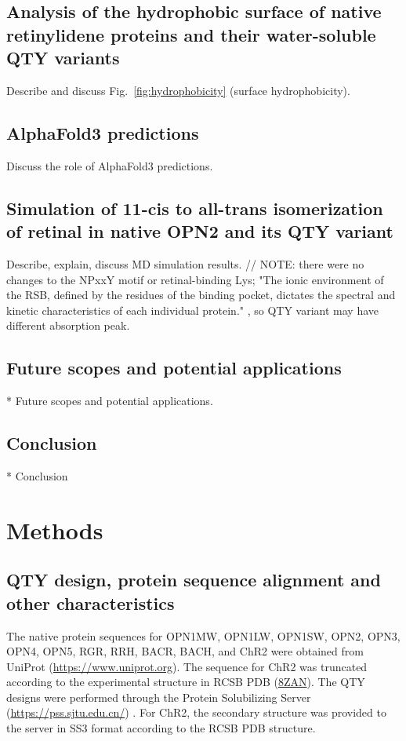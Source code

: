\documentclass[fleqn,10pt,lineno]{manuscript}
\begin{document}
\subsection*{Analysis of the hydrophobic surface of native retinylidene proteins and their water-soluble QTY variants}

Describe and discuss Fig.~\ref{fig:hydrophobicity} (surface hydrophobicity). 

\subsection*{AlphaFold3 predictions}

Discuss the role of AlphaFold3 predictions. 

\subsection*{Simulation of 11-cis to all-trans isomerization of retinal in native OPN2 and its QTY variant}

Describe, explain, discuss MD simulation results. // NOTE: there were no changes to the NPxxY motif or retinal-binding Lys; "The ionic environment of the RSB, defined by the residues of the binding pocket, dictates the spectral and kinetic characteristics of each individual protein." \citep{Fenno_2011}, so QTY variant may have different absorption peak. 

\subsection*{Future scopes and potential applications}

* Future scopes and potential applications. 

\subsection*{Conclusion}

* Conclusion

\section*{Methods}

\subsection*{QTY design, protein sequence alignment and other characteristics}

The native protein sequences for OPN1MW, OPN1LW, OPN1SW, OPN2, OPN3, OPN4, OPN5, RGR, RRH, BACR, BACH, and ChR2 were obtained from UniProt (\url{https://www.uniprot.org}). The sequence for ChR2 was truncated according to the experimental structure in RCSB PDB (\href{https://www.rcsb.org/structure/8ZAN}{8ZAN}). The QTY designs were performed through the Protein Solubilizing Server (\url{https://pss.sjtu.edu.cn/}) \citep{Tao_2022}. For ChR2, the secondary structure was provided to the server in SS3 format according to the RCSB PDB structure. 
\end{document}
